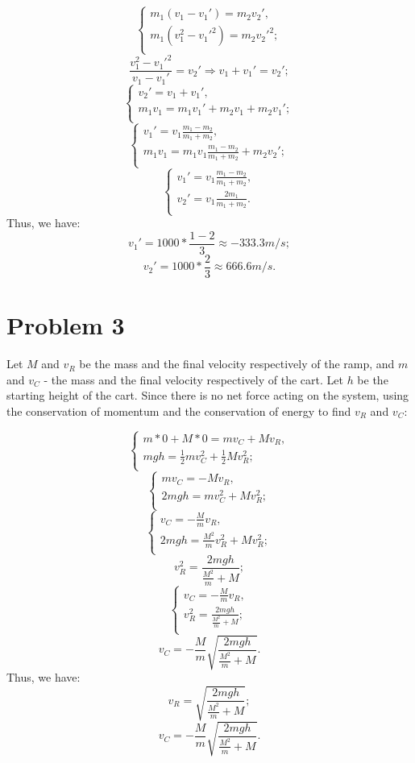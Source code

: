\documentclass{article}
\begin{document}
\[
\begin{cases}
m_1(v_1 - v_1\prime) = m_2v_2\prime,\\
m_1(v_1^2 - v_1\prime^2) = m_2v_2\prime^2;\\
\end{cases}
\]
\[
\frac{v_1^2 - v_1\prime^2}{v_1 - v_1\prime} = v_2\prime \Rightarrow v_1 + v_1\prime = v_2\prime;
\]
\[
\begin{cases}
v_2\prime = v_1 + v_1\prime,\\
m_1v_1 = m_1v_1\prime + m_2v_1 + m_2v_1\prime;\\
\end{cases}
\]
\[
\begin{cases}
v_1\prime = v_1\frac{m_1 - m_2}{m_1 + m_2},\\
m_1v_1 = m_1v_1\frac{m_1 - m_2}{m_1 + m_2} + m_2v_2\prime;\\
\end{cases}
\]
\[
\begin{cases}
v_1\prime = v_1\frac{m_1 - m_2}{m_1 + m_2},\\
v_2\prime = v_1\frac{2m_1}{m_1 + m_2}.\\
\end{cases}
\]
Thus, we have:
\[
v_1\prime = 1000 * \frac{1 - 2}{3} \approx -333.3m/s;
\]
\[
v_2\prime = 1000 * \frac{2}{3} \approx 666.6m/s.
\]

\section*{Problem 3}
Let $M$ and $v_R$ be the mass and the final velocity respectively of the ramp, and $m$ and $v_C$ - the mass and the final velocity respectively of the cart. Let $h$ be the starting height of the cart. Since there is no net force acting on the system, using the conservation of momentum and the conservation of energy to find $v_R$ and $v_C$:

\[
\begin{cases}
m * 0 + M * 0 = mv_C + Mv_R,\\
mgh = \frac{1}{2}mv_C^2 + \frac{1}{2}Mv_R^2;\\
\end{cases}
\]
\[
\begin{cases}
mv_C = -Mv_R,\\
2mgh = mv_C^2 + Mv_R^2;\\
\end{cases}
\]
\[
\begin{cases}
v_C = -\frac{M}{m}v_R,\\
2mgh = \frac{M^2}{m}v_R^2 + Mv_R^2;\\
\end{cases}
\]
\[
v_R^2 = \frac{2mgh}{\frac{M^2}{m} + M};
\]
\[
\begin{cases}
v_C = -\frac{M}{m}v_R,\\
v_R^2 = \frac{2mgh}{\frac{M^2}{m} + M};\\
\end{cases}
\]
\[
v_C = -\frac{M}{m}\sqrt{\frac{2mgh}{\frac{M^2}{m} + M}}.
\]
Thus, we have:
\[
v_R = \sqrt{\frac{2mgh}{\frac{M^2}{m} + M}};
\]
\[
v_C = -\frac{M}{m}\sqrt{\frac{2mgh}{\frac{M^2}{m} + M}}.
\]
\end{document}

